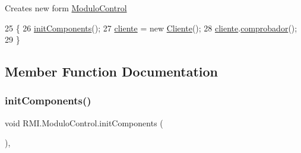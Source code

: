 Creates new form \mbox{\hyperlink{class_r_m_i_1_1_modulo_control}{Modulo\+Control}} 
\begin{DoxyCode}
25                            \{
26         \mbox{\hyperlink{class_r_m_i_1_1_modulo_control_ab6cd2b65e80f40751ef50b6dd3a999b2}{initComponents}}();
27         \mbox{\hyperlink{class_r_m_i_1_1_modulo_control_affa108de8511c1fdd849d2d6a6304d4e}{cliente}} = \textcolor{keyword}{new} \mbox{\hyperlink{class_sockets_1_1_cliente}{Cliente}}();
28         \mbox{\hyperlink{class_r_m_i_1_1_modulo_control_affa108de8511c1fdd849d2d6a6304d4e}{cliente}}.\mbox{\hyperlink{class_r_m_i_1_1_cliente_af1963dfc32e418055908fd85f49143e0}{comprobador}}();
29     \}
\end{DoxyCode}


\subsection{Member Function Documentation}
\mbox{\label{class_r_m_i_1_1_modulo_control_ab6cd2b65e80f40751ef50b6dd3a999b2}} 
\subsubsection{\texorpdfstring{init\+Components()}{initComponents()}}
{\footnotesize\ttfamily void R\+M\+I.\+Modulo\+Control.\+init\+Components (\begin{DoxyParamCaption}{ }\end{DoxyParamCaption})\hspace{0.3cm}{\ttfamily [inline]}, {\ttfamily [private]}}

